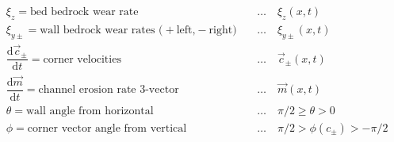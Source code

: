\documentclass[11pt]{article}
\begin{document}
    \begin{eqnarray}
     &\xi_z  = \text{bed bedrock wear rate} 
                       \qquad&\dots\quad \xi_z(x,t) \\
     &\xi_{y\pm}  = \text{wall bedrock wear rates (}+\text{left,}-\text{right)} 
                       \qquad&\dots\quad \xi_{y\pm}(x,t) \\
     &\dfrac{\mathrm{d}\vec{c}_\pm}{\mathrm{d}t}  = \text{corner velocities} 
                       \qquad&\dots\quad \vec{c}_\pm(x,t) \\
     &\dfrac{\mathrm{d}\vec{m}}{\mathrm{d}t}  = \text{channel erosion rate 3-vector} 
                       \qquad&\dots\quad \vec{m}(x,t) \\
     &\theta  = \text{wall angle from horizontal} 
                       \qquad&\dots\quad \pi/2\geq\theta> 0 \\
     &\phi  = \text{corner vector angle from vertical} 
                       \qquad&\dots\quad \pi/2 > \phi(c_\pm) > -\pi/2
\end{eqnarray}
\end{document}
